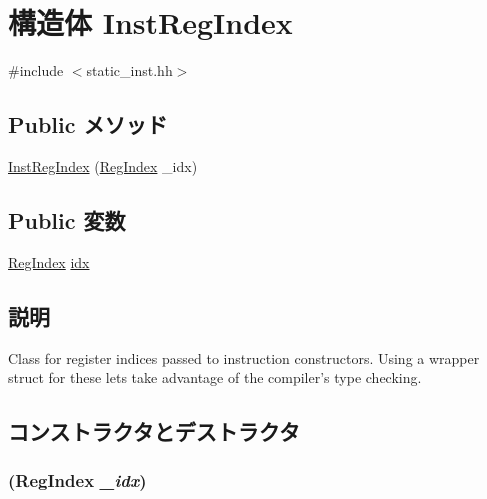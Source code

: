 \hypertarget{structX86ISA_1_1InstRegIndex}{
\section{構造体 InstRegIndex}
\label{structX86ISA_1_1InstRegIndex}
}


{\ttfamily \#include $<$static\_\-inst.hh$>$}\subsection*{Public メソッド}
\begin{DoxyCompactItemize}
\item 
\hyperlink{structX86ISA_1_1InstRegIndex_a67633b4fda597c64321dd77ff46b5188}{InstRegIndex} (\hyperlink{namespaceX86ISA_a69329e1d929a534ff51be6cf8216b69a}{RegIndex} \_\-idx)
\end{DoxyCompactItemize}
\subsection*{Public 変数}
\begin{DoxyCompactItemize}
\item 
\hyperlink{namespaceX86ISA_a69329e1d929a534ff51be6cf8216b69a}{RegIndex} \hyperlink{structX86ISA_1_1InstRegIndex_aaee9fd8ad7555c0960f0e79c462c00aa}{idx}
\end{DoxyCompactItemize}


\subsection{説明}
Class for register indices passed to instruction constructors. Using a wrapper struct for these lets take advantage of the compiler's type checking. 

\subsection{コンストラクタとデストラクタ}
\hypertarget{structX86ISA_1_1InstRegIndex_a67633b4fda597c64321dd77ff46b5188}{
\subsubsection[{InstRegIndex}]{ ({\bf RegIndex} {\em \_\-idx})}}
\label{structX86ISA_1_1InstRegIndex_a67633b4fda597c64321dd77ff46b5188}



